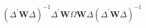 \begin{equation}
    \left(
      \Delta^{\prime}
      \mathbf{W}
      \Delta
    \right)^{-1}
    \Delta^{\prime}
    \mathbf{W}
    \Omega
    \mathbf{W}
    \Delta
    \left(
      \Delta^{\prime}
      \mathbf{W}
      \Delta
    \right)^{-1}
\end{equation}